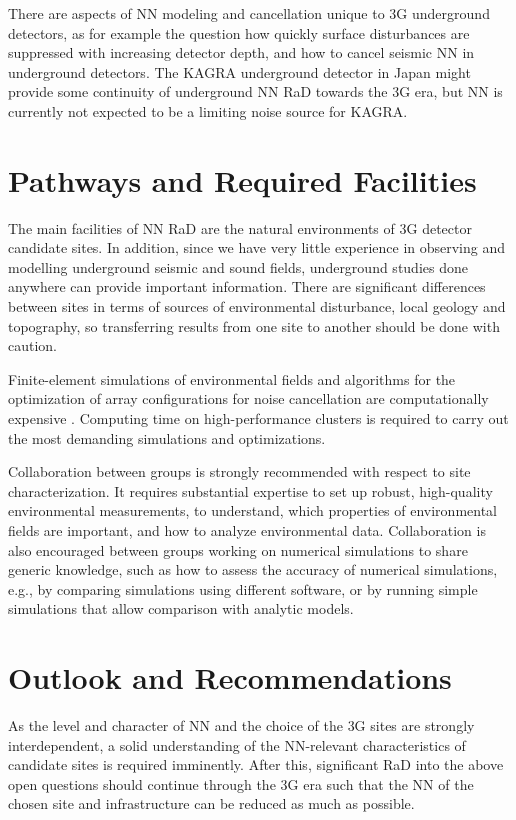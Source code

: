 There are aspects of \ac{NN} modeling and cancellation unique to \ac{3G} underground detectors, as for example the question how quickly surface disturbances are suppressed with increasing detector depth, and how to cancel seismic \ac{NN} in underground detectors. The \ac{KAGRA} underground detector in Japan might 
provide some continuity of underground \ac{NN} \ac{RaD} towards the \ac{3G} era, but \ac{NN} is currently not expected to be a limiting noise source for \ac{KAGRA}.

\section{Pathways and Required Facilities}
The main facilities of \ac{NN} \ac{RaD} are the natural environments of \ac{3G} detector candidate sites. In addition, since we have very little experience in observing and modelling underground seismic and sound fields, underground studies done anywhere can provide important information. There are significant differences between sites in terms of sources of environmental disturbance, local geology and topography, so transferring results from one site to another should be done with caution.

Finite-element simulations of environmental fields and algorithms for the optimization of array configurations for noise cancellation are computationally expensive \cite{Andric:2020}. Computing time on high-performance clusters is required to carry out the most demanding simulations and optimizations.

Collaboration between groups is strongly recommended with respect to site characterization. It requires substantial expertise to set up robust, high-quality environmental measurements, to understand, which properties of environmental fields are important, and how to analyze environmental data. Collaboration is also encouraged between groups working on numerical simulations to share generic knowledge, such as how to assess the accuracy of numerical simulations, e.g., by comparing simulations using different software, or by running simple simulations that allow comparison with analytic models.

\section{Outlook and Recommendations}

As the level and character of \ac{NN} and the choice of the \ac{3G} sites are strongly interdependent, a solid understanding of the \ac{NN}-relevant characteristics of candidate sites is required imminently. After this, significant \ac{RaD} into the above open questions should continue through the \ac{3G} era such that the \ac{NN} of the chosen site and infrastructure can be reduced as much as possible. 

